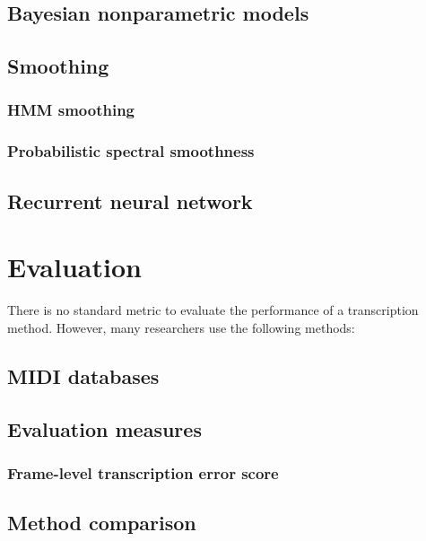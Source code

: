 \documentclass[5p]{elsarticle}
\begin{document}
\subsection{Bayesian nonparametric models}
\subsection{Smoothing}
\subsubsection{HMM smoothing}
\subsubsection{Probabilistic spectral smoothness}
\subsection{Recurrent neural network}

\section{Evaluation}

There is no standard metric to evaluate the performance of a transcription method. However, many researchers use the following methods:

\subsection{MIDI databases} 

\subsection{Evaluation measures}

\subsubsection{}

\subsubsection{Frame-level transcription error score}

\subsection{Method comparison}
\end{document}
